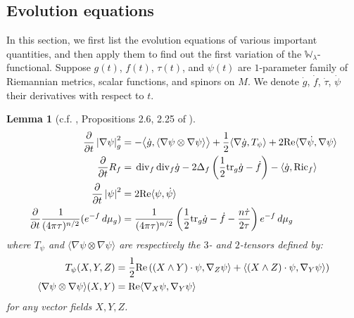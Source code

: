 \documentclass{amsart}
\newtheorem{lemma}[theorem]{Lemma}
\theoremstyle{definition}
\theoremstyle{remark}
\numberwithin{equation}{section}
\newcommand{\abs}[1]{\left|#1\right|}
\newcommand{\tr}{\textup{tr}}
\newcommand{\Ric}{\textup{Ric}}
\renewcommand{\div}{\,\textup{div}}
\newcommand{\D}[2]{\frac{\partial #1}{\partial #2}}
\begin{document}
\subsection{Evolution equations}
In this section, we first list the evolution equations of various important quantities, and then apply them to find out the first variation of the $\mathbb{W}_\lambda$-functional.
Suppose $g(t)$, $f(t)$, $\tau(t)$, and $\psi(t)$ are $1$-parameter family of Riemannian metrics, scalar functions, and spinors on $M$. We denote $\dot{g}$, $\dot{f}$, $\dot\tau$, $\dot\psi$ their derivatives with respect to $t$. 
\begin{lemma}[c.f. \cite{AWW}, Propositions 2.6, 2.25 of \cite{BO23}] 
\begin{align}
\label{ddt_|grad psi|^2}
\D{}{t}\abs{\nabla\psi}_g^2 & = - \big\langle \dot{g}, \langle \nabla\psi \otimes \nabla\psi\rangle\big\rangle + \frac{1}{2}\langle \nabla\dot{g}, T_\psi\rangle + 2\textup{Re}\langle \nabla\dot\psi, \nabla\psi\rangle\\
\D{}{t}R_f & = \div_f \div_f \dot{g} - 2\Delta_f\left(\frac{1}{2}\tr_g\dot{g} - \dot{f}\right) - \langle \dot{g},\Ric_f\rangle\\
\D{}{t}\abs{\psi}^2 & = 2\textup{Re}\langle \psi,\dot\psi\rangle\\
\D{}{t}\frac{1}{(4\pi\tau)^{n/2}}(e^{-f}\,d\mu_g) & = \frac{1}{(4\pi\tau)^{n/2}}\left(\frac{1}{2}\tr_g \dot{g} - \dot{f} - \frac{n\dot\tau}{2\tau}\right)e^{-f}\,d\mu_g
\end{align}
where $T_\psi$ and $\langle \nabla\psi \otimes \nabla\psi\rangle$ are respectively the $3$- and $2$-tensors defined by:
\begin{align}
T_\psi(X,Y,Z) & = \frac{1}{2}\textup{Re}\left((X \wedge Y) \cdot \psi, \nabla_Z \psi\rangle + \langle (X \wedge Z) \cdot \psi, \nabla_Y \psi\rangle \right) \label{eq:T_psi}\\
\langle \nabla\psi \otimes \nabla\psi\rangle(X,Y) & = \textup{Re} \langle \nabla_X \psi, \nabla_Y \psi\rangle \label{eq:nabla_psi^2}
\end{align}
for any vector fields $X, Y, Z$.
\end{lemma}
\end{document}
